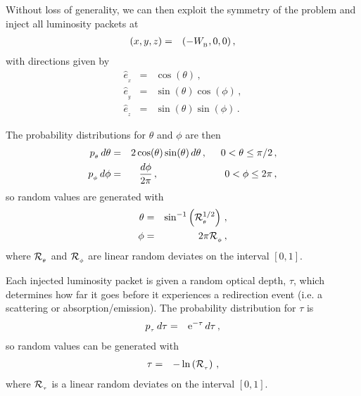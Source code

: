 \documentclass[usenatbib]{mn2e}
\newcommand{\subB}{_{_{\rm B}}}
\numberwithin{equation}{section}
\begin{document}
Without loss of generality, we can then exploit the symmetry of the problem and inject all luminosity packets at 
\begin{eqnarray}
(x,y,z)&=&(-W\subB,0,0)\,,
\end{eqnarray}
with directions given by
\begin{eqnarray}
{\hat e}_{_x}&=&\cos(\theta)\,,\\
{\hat e}_{_y}&=&\sin(\theta)\cos(\phi)\,,\\
{\hat e}_{_z}&=&\sin(\theta)\sin(\phi)\,.
\end{eqnarray}

The probability distributions for $\theta$ and $\phi$ are then
\begin{eqnarray}
p_{_\theta}\,d\theta&=&2\cos(\theta)\sin(\theta)\,d\theta\,,\hspace{0.5cm}0<\theta\leq\pi/2\,,\\
p_{_\phi}\,d\phi&=&\frac{d\phi}{2\pi}\,,\hspace{2.38cm}0<\phi\leq2\pi\,,
\end{eqnarray}
so random values are generated with 
\begin{eqnarray}
\theta&=&\sin^{-1}\left({\cal R}_{_\theta}^{1/2}\right)\,,\\
\phi&=&2\pi {\cal R}_{_\phi}\,,
\end{eqnarray}
where ${\cal R}_{_\theta}$ and ${\cal R}_{_\phi}$ are linear random deviates on the interval $[0,1]$.

Each injected luminosity packet is given a random optical depth, $\tau$, which determines how far it goes before it experiences a redirection event (i.e. a scattering or absorption/emission). The probability distribution for $\tau$ is
\begin{eqnarray}
p_{_\tau}\,d\tau&=&{\rm e}^{-\tau}\,d\tau\,,
\end{eqnarray}
so random values can be generated with
\begin{eqnarray}
\tau&=&-\ln\left({\cal R}_{_\tau}\right)\,,
\end{eqnarray}
where ${\cal R}_{_\tau}$ is a linear random deviates on the interval $[0,1]$.
\end{document}
